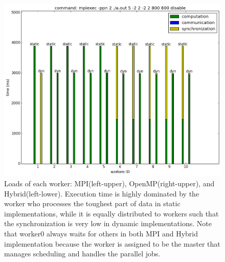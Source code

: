 \documentclass[12pt]{article}
\makeatletter
\renewenvironment{itemize}
{\list{$\bullet$}{\leftmargin\z@ \labelwidth\z@ \itemindent-\leftmargin
\let\makelabel\descriptionlabel}}
{\endlist}
\makeatother
\begin{document}
\begin{itemize}
    \vspace{-1cm}
    \begin{figure}
        \hspace{-1cm}
        \includegraphics[scale=.35]{./threads_load_Hybrid.png}
        \hspace{1cm}
        \vspace{-.5cm}
        \caption{Loads of each worker: \hspace{\textwidth}MPI(left-upper), OpenMP(right-upper), and Hybrid(left-lower). Execution time is highly dominated by the worker who processes the toughest part of data in static implementations, while it is equally distributed to workers such that the synchronization is very low in dynamic implementations. Note that worker0 always waits for others in both MPI and Hybrid implementation because the worker is assigned to be the master that manages scheduling and handles the parallel jobs.}
    \end{figure}


\end{itemize}
\end{document}
